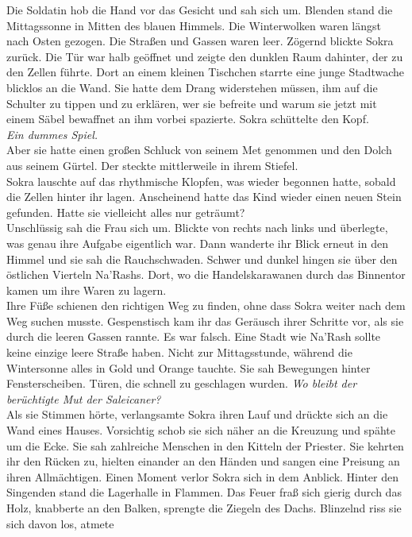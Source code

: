 Die Soldatin hob die Hand vor das Gesicht und sah sich um. Blenden stand die Mittagssonne in Mitten 
des blauen Himmels. Die Winterwolken waren längst nach Osten gezogen. Die Straßen und Gassen 
waren leer. Zögernd blickte Sokra zurück. Die Tür war halb geöffnet und zeigte den dunklen Raum 
dahinter, der zu den Zellen führte. Dort an einem kleinen Tischchen starrte eine junge Stadtwache 
blicklos an die Wand. Sie hatte dem Drang widerstehen müssen, ihm auf die Schulter zu tippen und zu 
erklären, wer sie befreite und warum sie jetzt mit einem Säbel bewaffnet an ihm vorbei spazierte. 
Sokra schüttelte den Kopf.\\
\textit{Ein dummes Spiel.}\\
Aber sie hatte einen großen Schluck von seinem Met genommen und den Dolch aus seinem Gürtel. Der 
steckte mittlerweile in ihrem Stiefel.\\
Sokra lauschte auf das rhythmische Klopfen, was wieder begonnen hatte, sobald die Zellen hinter ihr 
lagen. Anscheinend hatte das Kind wieder einen neuen Stein gefunden. Hatte sie vielleicht alles nur 
geträumt?\\
Unschlüssig sah die Frau sich um. Blickte von rechts nach links und überlegte, was genau ihre 
Aufgabe eigentlich war. Dann wanderte ihr Blick erneut in den Himmel und sie sah die Rauchschwaden. 
Schwer und dunkel hingen sie über den östlichen Vierteln Na'Rashs. Dort, wo die Handelskarawanen 
durch das Binnentor kamen um ihre Waren zu lagern.\\
Ihre Füße schienen den richtigen Weg zu finden, ohne dass Sokra weiter nach dem Weg suchen musste. 
Gespenstisch kam ihr das Geräusch ihrer Schritte vor, als sie durch die leeren Gassen rannte. Es 
war falsch. Eine Stadt wie Na'Rash sollte keine einzige leere Straße haben. Nicht zur 
Mittagsstunde, während die Wintersonne alles in Gold und Orange tauchte. Sie sah Bewegungen hinter 
Fensterscheiben. Türen, die schnell zu geschlagen wurden. \textit{Wo bleibt der berüchtigte Mut der 
Saleicaner?}\\
Als sie Stimmen hörte, verlangsamte Sokra ihren Lauf und drückte sich an die Wand eines Hauses. 
Vorsichtig schob sie sich näher an die Kreuzung und spähte um die Ecke. Sie sah zahlreiche Menschen 
in den Kitteln der Priester. Sie kehrten ihr den Rücken zu, hielten einander an den Händen und 
sangen eine Preisung an ihren Allmächtigen. Einen Moment verlor Sokra sich in dem Anblick. Hinter 
den Singenden stand die Lagerhalle in Flammen. Das Feuer fraß sich gierig durch das Holz, knabberte 
an den Balken, sprengte die Ziegeln des Dachs. Blinzelnd riss sie sich davon los, atmete 

